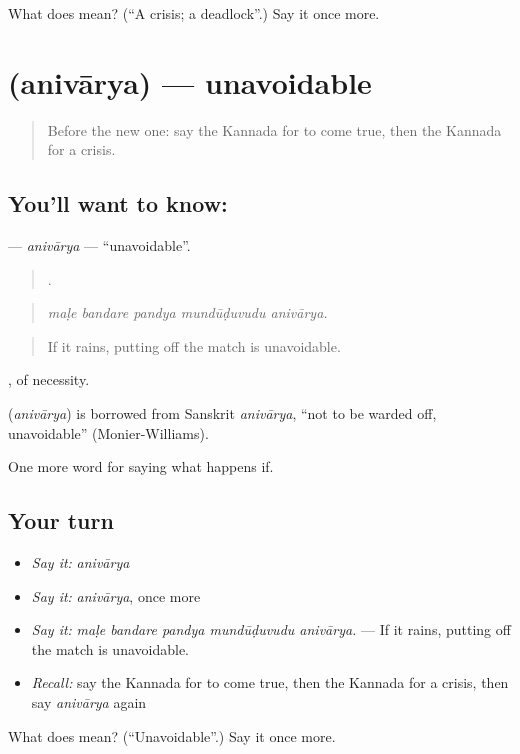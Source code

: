 \begin{tcolorbox}[breakable,colback=teal!4,colframe=teal!35!black,title={Before you move on}]
What does  mean? (\textquotedblleft{}A crisis; a deadlock\textquotedblright{}.) Say it once more.
\end{tcolorbox}
\section[\texorpdfstring{\kn{ಅನಿವಾರ್ಯ} (anivārya)}{ಅನಿವಾರ್ಯ (anivārya)}]{ (anivārya) — unavoidable}

\label{lesson:KA-C419-anivarya}



\begin{quote}
Before the new one: say the Kannada for to come true, then the Kannada for a crisis.
\end{quote}

\subsection*{You'll want to know: }
\textbf{} — \emph{anivārya} — \textquotedblleft{}unavoidable\textquotedblright{}.

\begin{quote}
    .
\end{quote}

\begin{quote}
\emph{maḷe bandare pandya mundūḍuvudu anivārya.}
\end{quote}

\begin{quote}
If it rains, putting off the match is unavoidable.
\end{quote}

, of necessity.

\begin{cousinweb}
\textbf{} (\emph{anivārya}) is borrowed from Sanskrit \emph{anivārya}, \textquotedblleft{}not to be warded off, unavoidable\textquotedblright{} (Monier-Williams).
\end{cousinweb}

\begin{grammarlens}[title={What you've built}]
One more word for saying what happens if.
\end{grammarlens}

\subsection*{Your turn}
\begin{itemize}
\raggedright
  \item \emph{Say it:} \emph{anivārya}
  \item \emph{Say it:} \emph{anivārya}, once more
  \item \emph{Say it:} \emph{maḷe bandare pandya mundūḍuvudu anivārya.} — If it rains, putting off the match is unavoidable.
  \item \emph{Recall:} say the Kannada for to come true, then the Kannada for a crisis, then say \emph{anivārya} again
\end{itemize}

\begin{tcolorbox}[breakable,colback=teal!4,colframe=teal!35!black,title={Before you move on}]
What does  mean? (\textquotedblleft{}Unavoidable\textquotedblright{}.) Say it once more.
\end{tcolorbox}
